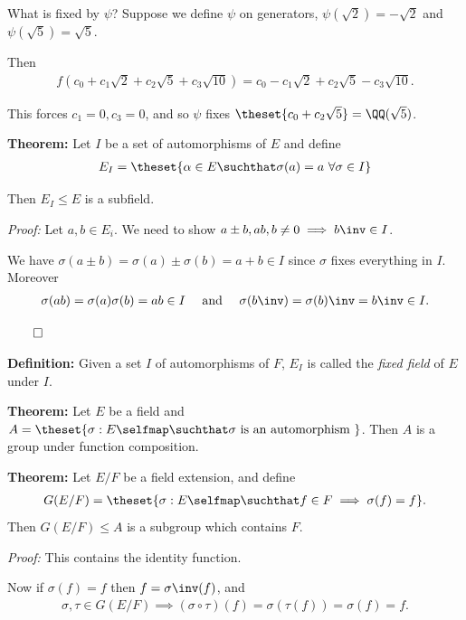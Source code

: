 What is fixed by \(\psi\)? Suppose we define \(\psi\) on generators,
\(\psi(\sqrt 2) = -\sqrt 2\) and \(\psi(\sqrt 5) = \sqrt 5\).

Then
\begin{align*}
f(c_0 + c_1 \sqrt 2 + c_2 \sqrt 5 + c_3 \sqrt{10}) = c_0 - c_1\sqrt 2 + c_2 \sqrt 5 - c_3\sqrt{10}
.\end{align*}

This forces \(c_1 = 0, c_3 = 0\), and so \(\psi\) fixes
\(\theset{ c_0 + c_2 \sqrt 5 } = \QQ(\sqrt 5)\).

\textbf{Theorem:} Let \(I\) be a set of automorphisms of \(E\) and
define
\begin{align*}
E_I = \theset{\alpha \in E \suchthat \sigma(a) = a ~\forall \sigma \in I}
\end{align*}

Then \(E_I \leq E\) is a subfield.

\emph{Proof:} Let \(a,b \in E_i\). We need to show
\(a \pm b, ab, b\neq 0 \implies b\inv \in I\).

We have \(\sigma(a\pm b) = \sigma(a) \pm \sigma(b) = a + b \in I\) since
\(\sigma\) fixes everything in \(I\). Moreover
\begin{align*}
\sigma(ab) = \sigma(a)\sigma(b) = ab \in I
\quad \text{ and } \quad
\sigma(b\inv) = \sigma(b)\inv = b\inv \in I
.\end{align*}

\(\qed\)

\textbf{Definition:} Given a set \(I\) of automorphisms of \(F\),
\(E_I\) is called the \emph{fixed field} of \(E\) under \(I\).

\textbf{Theorem:} Let \(E\) be a field and
\(A = \theset{\sigma:E \selfmap \suchthat \sigma\text{ is an automorphism }}\).
Then \(A\) is a group under function composition.

\textbf{Theorem:} Let \(E/F\) be a field extension, and define
\begin{align*}
G(E/F) = \theset{\sigma:E\selfmap \suchthat f\in F \implies \sigma(f) = f}
.\end{align*} Then \(G(E/F) \leq A\) is a subgroup which contains \(F\).

\emph{Proof:} This contains the identity function.

Now if \(\sigma(f) = f\) then \(f = \sigma\inv(f)\), and
\begin{align*}
\sigma, \tau \in G(E/F) \implies (\sigma \circ \tau)(f) = \sigma(\tau(f)) = \sigma(f) = f
.\end{align*}

